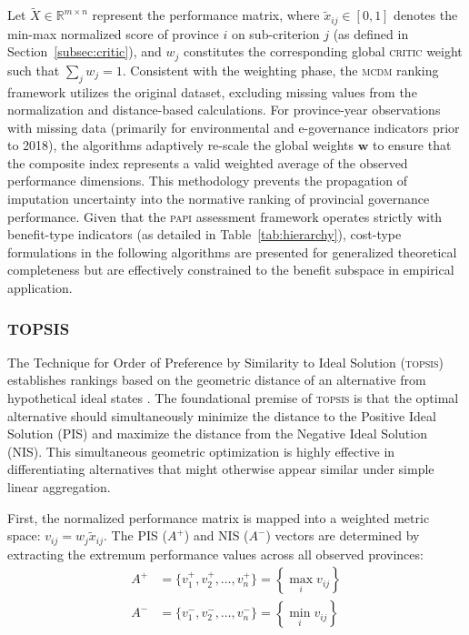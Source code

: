 \documentclass[12pt,a4paper]{article}
\newcommand{\PAPI}{\textsc{papi}\xspace}
\newcommand{\MCDM}{\textsc{mcdm}\xspace}
\newcommand{\CRITIC}{\textsc{critic}\xspace}
\newcommand{\TOPSIS}{\textsc{topsis}\xspace}
\begin{document}
Let \( \tilde{X} \in \mathbb{R}^{m \times n} \) represent the performance matrix, where \( \tilde{x}_{ij} \in [0, 1] \) denotes the min-max normalized score of province \( i \) on sub-criterion \( j \) (as defined in Section~\ref{subsec:critic}), and \( w_j \) constitutes the corresponding global \CRITIC weight such that \( \sum_j w_j = 1 \). Consistent with the weighting phase, the \MCDM ranking framework utilizes the original dataset, excluding missing values from the normalization and distance-based calculations. For province-year observations with missing data (primarily for environmental and e-governance indicators prior to 2018), the algorithms adaptively re-scale the global weights $\mathbf{w}$ to ensure that the composite index represents a valid weighted average of the observed performance dimensions. This methodology prevents the propagation of imputation uncertainty into the normative ranking of provincial governance performance. Given that the \PAPI assessment framework operates strictly with benefit-type indicators (as detailed in Table~\ref{tab:hierarchy}), cost-type formulations in the following algorithms are presented for generalized theoretical completeness but are effectively constrained to the benefit subspace in empirical application.

\subsubsection{TOPSIS}
\label{subsubsec:topsis}
The Technique for Order of Preference by Similarity to Ideal Solution (\TOPSIS) establishes rankings based on the geometric distance of an alternative from hypothetical ideal states \citep{Hwang1981}. The foundational premise of \TOPSIS is that the optimal alternative should simultaneously minimize the distance to the Positive Ideal Solution (PIS) and maximize the distance from the Negative Ideal Solution (NIS). This simultaneous geometric optimization is highly effective in differentiating alternatives that might otherwise appear similar under simple linear aggregation.

First, the normalized performance matrix is mapped into a weighted metric space: \( v_{ij} = w_j \tilde{x}_{ij} \). The PIS (\( A^+ \)) and NIS (\( A^- \)) vectors are determined by extracting the extremum performance values across all observed provinces:
\begin{align}
    A^+ &= \{ v_1^+, v_2^+, \dots, v_n^+ \} = \left\{ \max_i v_{ij} \right\} \\
    A^- &= \{ v_1^-, v_2^-, \dots, v_n^- \} = \left\{ \min_i v_{ij} \right\}
\end{align}
\end{document}
